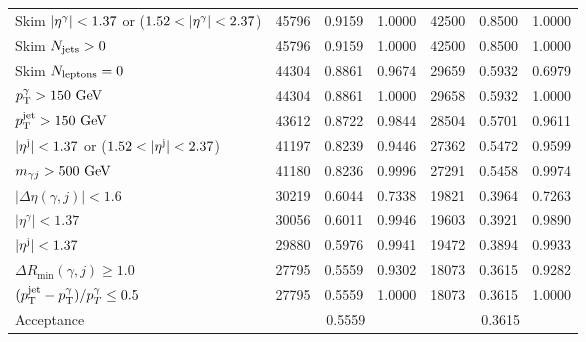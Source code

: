 \begin{table}[ht!]
{\begin{tabular}{lrrrrrr}
            Skim $|\eta^{\gamma}| < 1.37$ or ($1.52 < |\eta^{\gamma}| < 2.37$)  & 45796 & 0.9159 & 1.0000               & 42500 & 0.8500 & 1.0000 \\
            Skim $N_{\text{jets}}>0$                                         & 45796 & 0.9159 & 1.0000               & 42500 & 0.8500 & 1.0000 \\
            Skim $N_{\text{leptons}}=0$                                          & 44304 & 0.8861 & 0.9674               & 29659 & 0.5932 & 0.6979 \\
            $p_{\text{T}}^{\gamma} > 150~\text{GeV}$                                     & 44304 & 0.8861 & 1.0000               & 29658 & 0.5932 & 1.0000 \\
            $p_{\text{T}}^\text{jet} > 150~\text{GeV}$                                     & 43612 & 0.8722 & 0.9844               & 28504 & 0.5701 & 0.9611 \\
            $|\eta^{\text{j}}| < 1.37$ or ($1.52 < |\eta^{\text{j}}| < 2.37$)       & 41197 & 0.8239 & 0.9446               & 27362 & 0.5472 & 0.9599 \\
            $m_{\gamma j} > 500~\text{GeV}$                               & 41180 & 0.8236 & 0.9996               & 27291 & 0.5458 & 0.9974 \\
            $|\Delta\eta(\gamma,j)| < 1.6$                          & 30219 & 0.6044 & 0.7338               & 19821 & 0.3964 & 0.7263 \\
            $|\eta^{\gamma}| < 1.37$                                & 30056 & 0.6011 & 0.9946               & 19603 & 0.3921 & 0.9890 \\
            $|\eta^{\text{j}}| < 1.37$                                      & 29880 & 0.5976 & 0.9941               & 19472 & 0.3894 & 0.9933 \\
            $\Delta R_{\text{min}}(\gamma,j) \geq 1.0$              & 27795 & 0.5559 & 0.9302               & 18073 & 0.3615 & 0.9282 \\
            $(p_{\text{T}}^\text{jet} - p_{\text{T}}^{\gamma}) / p_{T}^{\gamma} \leq 0.5$           & 27795 & 0.5559 & 1.0000               & 18073 & 0.3615 & 1.0000 \\
            \midrule
            Acceptance                                              & \multicolumn{3}{c}{0.5559}            & \multicolumn{3}{c}{0.3615} \\
            \bottomrule
        \end{tabular}
    }
    \label{tab:signals:acc_eff:acceptances}
\end{table}


